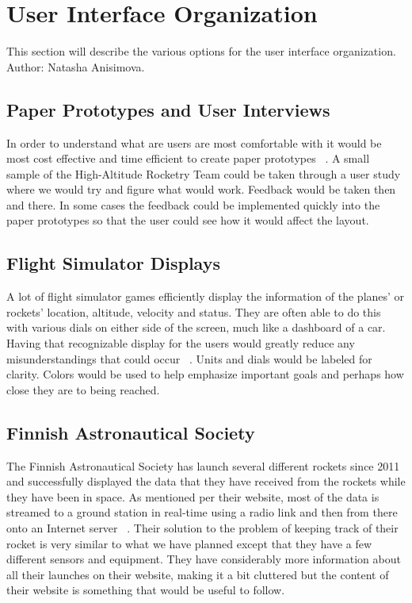 \documentclass[10pt,draftclsnofoot,onecolumn]{IEEEtran}
\begin{document}
	
	\section{User Interface Organization}
	This section will describe the various options for the user interface organization. Author: Natasha Anisimova.
	
	\subsection{Paper Prototypes and User Interviews}
	In order to understand what are users are most comfortable with it would be most cost effective and time efficient
	to create paper prototypes ~\cite{what-is-prototyping}. 
	A small sample of the High-Altitude Rocketry Team could be taken through a user study where we would try and figure
	what would work. 
	Feedback would be taken then and there.
	In some cases the feedback could be implemented quickly into the paper prototypes so that the user could see how it
	would affect the layout.
	
	\subsection{Flight Simulator Displays}
	A lot of flight simulator games efficiently display the information of the planes' or rockets' location, altitude,
	velocity and status.
	They are often able to do this with various dials on either side of the screen, much like a dashboard of a car.
	Having that recognizable display for the users would greatly reduce any misunderstandings that could occur ~\cite{flight-simulation-in-aerospace}. 
	Units and dials would be labeled for clarity. 
	Colors would be used to help emphasize important goals and perhaps how close they are to being reached.
	
	\subsection{Finnish Astronautical Society}
	The Finnish Astronautical Society has launch several different rockets since 2011 and successfully displayed the
	data that they have received from the rockets while they have been in space. 
	As mentioned per their website, most of the data is streamed to a ground station in real-time using a radio link and
	then from there onto an Internet server ~\cite{real-time-rocket-telementry-experiment}. 
	Their solution to the problem of keeping track of their rocket is very similar to what we have planned except that they
	have a few different sensors and equipment.
	They have considerably more information about all their launches on their website, making it a bit cluttered but the 
	content of their website is something that would be useful to follow.
	
\end{document}
